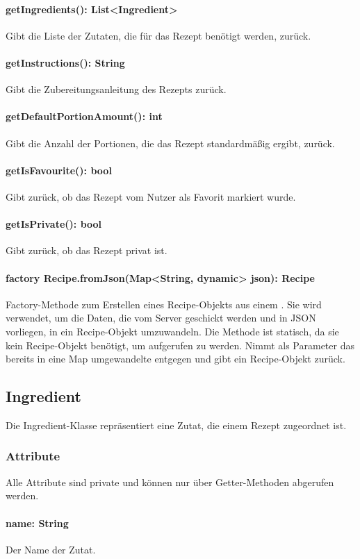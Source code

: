 \documentclass[parskip=full]{scrartcl}
\begin{document}
\paragraph{getIngredients(): List<Ingredient>}
Gibt die Liste der Zutaten, die für das Rezept benötigt werden, zurück.
\paragraph{getInstructions(): String}
Gibt die Zubereitungsanleitung des Rezepts zurück.
\paragraph{getDefaultPortionAmount(): int}
Gibt die Anzahl der Portionen, die das Rezept standardmäßig ergibt, zurück.
\paragraph{getIsFavourite(): bool}
Gibt zurück, ob das Rezept vom Nutzer als Favorit markiert wurde.
\paragraph{getIsPrivate(): bool}
Gibt zurück, ob das Rezept privat ist.
\paragraph{factory Recipe.fromJson(Map<String, dynamic> json): Recipe} 
Factory-Methode zum Erstellen eines Recipe-Objekts aus einem . Sie wird verwendet, um die Daten, die vom Server geschickt werden und in \Gls{JSON} vorliegen, in ein Recipe-Objekt umzuwandeln. Die Methode ist statisch, da sie kein Recipe-Objekt benötigt, um aufgerufen zu werden. Nimmt als Parameter das bereits in eine Map umgewandelte  entgegen und gibt ein Recipe-Objekt zurück.

\subsection{Ingredient}
Die Ingredient-Klasse repräsentiert eine Zutat, die einem Rezept zugeordnet ist.
\subsubsection{Attribute}
Alle Attribute sind private und können nur über Getter-Methoden abgerufen werden.
\paragraph{name: String}
Der Name der Zutat.
\end{document}
